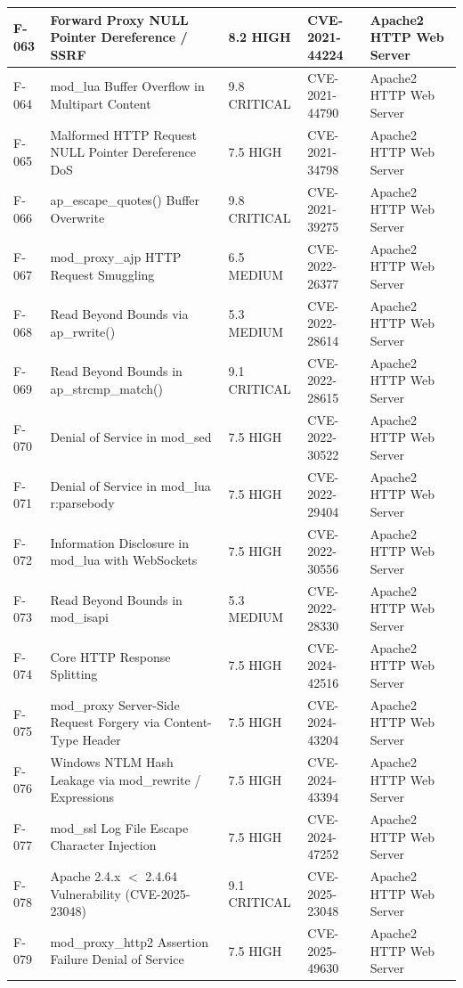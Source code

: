 \begin{longtable}{|l|p{5cm}|l|l|p{3cm}|}
F-063 & Forward Proxy NULL Pointer Dereference / SSRF & 8.2 HIGH & CVE-2021-44224 & Apache2 HTTP Web Server\\ \hline
F-064 & mod\_lua Buffer Overflow in Multipart Content & 9.8 CRITICAL & CVE-2021-44790 & Apache2 HTTP Web Server\\ \hline
F-065 & Malformed HTTP Request NULL Pointer Dereference DoS & 7.5 HIGH & CVE-2021-34798 & Apache2 HTTP Web Server\\ \hline
F-066 & ap\_escape\_quotes() Buffer Overwrite & 9.8 CRITICAL & CVE-2021-39275& Apache2 HTTP Web Server \\ \hline
F-067 & mod\_proxy\_ajp HTTP Request Smuggling & 6.5 MEDIUM & CVE-2022-26377 & Apache2 HTTP Web Server\\ \hline
F-068 & Read Beyond Bounds via ap\_rwrite() & 5.3 MEDIUM & CVE-2022-28614 & Apache2 HTTP Web Server\\ \hline
F-069 & Read Beyond Bounds in ap\_strcmp\_match() & 9.1 CRITICAL & CVE-2022-28615 & Apache2 HTTP Web Server\\ \hline
F-070 & Denial of Service in mod\_sed & 7.5 HIGH & CVE-2022-30522 & Apache2 HTTP Web Server\\ \hline
F-071 & Denial of Service in mod\_lua r:parsebody & 7.5 HIGH & CVE-2022-29404 & Apache2 HTTP Web Server\\ \hline
F-072 & Information Disclosure in mod\_lua with WebSockets & 7.5 HIGH & CVE-2022-30556 & Apache2 HTTP Web Server\\ \hline
F-073 & Read Beyond Bounds in mod\_isapi & 5.3 MEDIUM & CVE-2022-28330 & Apache2 HTTP Web Server\\ \hline
F-074 & Core HTTP Response Splitting & 7.5 HIGH & CVE-2024-42516 & Apache2 HTTP Web Server\\ \hline
F-075 & mod\_proxy Server-Side Request Forgery via Content-Type Header & 7.5 HIGH & CVE-2024-43204 & Apache2 HTTP Web Server\\ \hline
F-076 & Windows NTLM Hash Leakage via mod\_rewrite / Expressions & 7.5 HIGH & CVE-2024-43394 & Apache2 HTTP Web Server\\ \hline
F-077 & mod\_ssl Log File Escape Character Injection & 7.5 HIGH & CVE-2024-47252 & Apache2 HTTP Web Server\\ \hline
F-078 & Apache 2.4.x $<$ 2.4.64 Vulnerability (CVE-2025-23048) & 9.1 CRITICAL & CVE-2025-23048 & Apache2 HTTP Web Server\\ \hline
F-079 & mod\_proxy\_http2 Assertion Failure Denial of Service & 7.5 HIGH & CVE-2025-49630 & Apache2 HTTP Web Server\\ \hline

\end{longtable}
